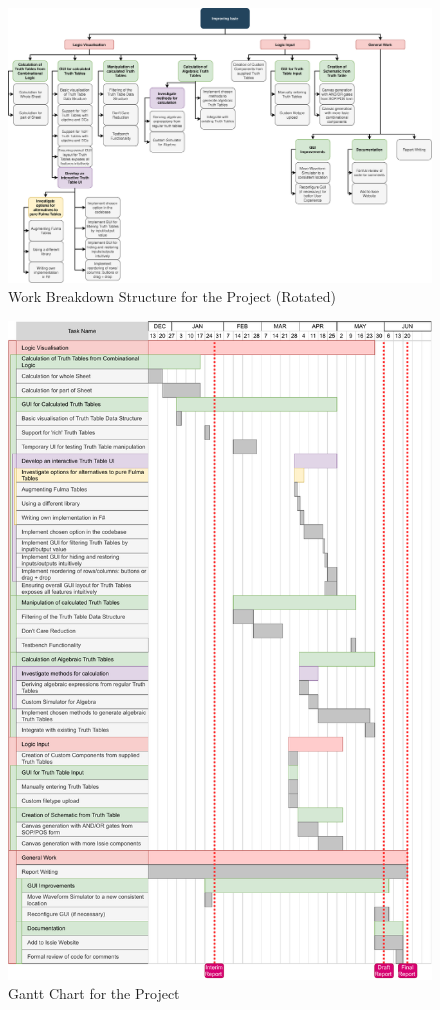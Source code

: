 \begin{figure}
    \centering
    \includegraphics[width=22cm,angle=270,origin=c]{05.ImpPlan/wbs.eps}
    \caption{Work Breakdown Structure for the Project (Rotated)}
    \label{fig:wbs}
\end{figure}

\begin{figure}
    \centering
    \includegraphics*[width=\textwidth]{05.ImpPlan/gantt_update.pdf}
    \caption{Gantt Chart for the Project}
    \label{fig:gantt}
\end{figure}